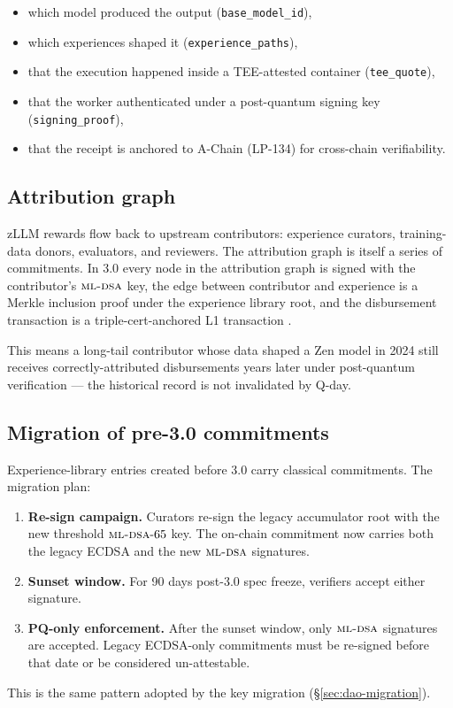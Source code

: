 \begin{itemize}[leftmargin=1.2em]
  \item which model produced the output (\texttt{base\_model\_id}),
  \item which experiences shaped it (\texttt{experience\_paths}),
  \item that the execution happened inside a TEE-attested container
        (\texttt{tee\_quote}),
  \item that the worker authenticated under a post-quantum signing
        key (\texttt{signing\_proof}),
  \item that the receipt is anchored to A-Chain (LP-134) for
        cross-chain verifiability.
\end{itemize}

\subsection{Attribution graph}

zLLM rewards flow back to upstream contributors: experience curators,
training-data donors, evaluators, and reviewers. The attribution
graph is itself a series of commitments. In 3.0 every node in the
attribution graph is signed with the contributor's $\textsc{ml-dsa}{}$ key,
the edge between contributor and experience is a Merkle inclusion
proof under the experience library root, and the disbursement
transaction is a triple-cert-anchored \Lux{} L1 transaction
\cite{lp-020}.

This means a long-tail contributor whose data shaped a Zen model in
2024 still receives correctly-attributed disbursements years later
under post-quantum verification --- the historical record is not
invalidated by Q-day.

\subsection{Migration of pre-3.0 commitments}

Experience-library entries created before 3.0 carry classical
commitments. The migration plan:

\begin{enumerate}[leftmargin=1.4em]
  \item \textbf{Re-sign campaign.} Curators re-sign the legacy
        accumulator root with the new threshold $\textsc{ml-dsa}{}\text{-}65$
        key. The on-chain commitment now carries both the legacy
        ECDSA and the new $\textsc{ml-dsa}{}$ signatures.
  \item \textbf{Sunset window.} For 90 days post-3.0 spec freeze,
        verifiers accept either signature.
  \item \textbf{PQ-only enforcement.} After the sunset window,
        only $\textsc{ml-dsa}{}$ signatures are accepted. Legacy ECDSA-only
        commitments must be re-signed before that date or be
        considered un-attestable.
\end{enumerate}

This is the same pattern adopted by the \DAO{} key migration
(\S\ref{sec:dao-migration}).
